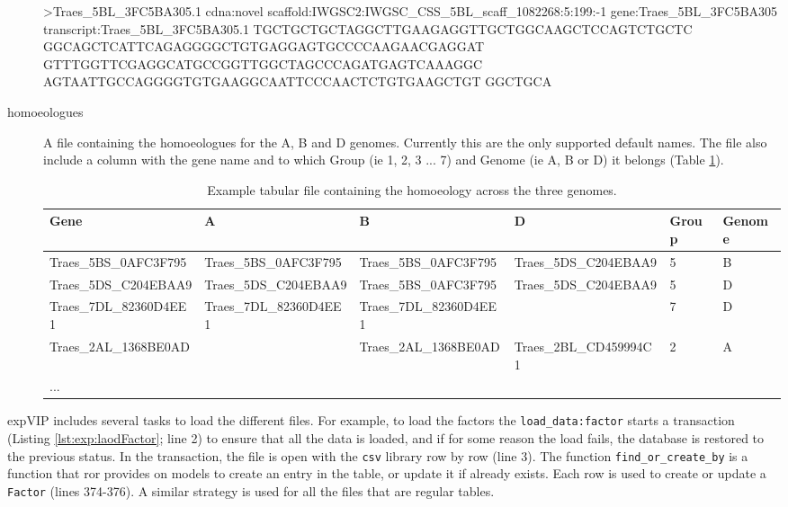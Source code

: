 \begin{description}
\begin{code}[label=lst:poly:geneFa, caption={[Gene set fasta file] A fasta entry on of the gene set.}]
>Traes_5BL_3FC5BA305.1 cdna:novel scaffold:IWGSC2:IWGSC_CSS_5BL_scaff_1082268:5:199:-1 gene:Traes_5BL_3FC5BA305 transcript:Traes_5BL_3FC5BA305.1
TGCTGCTGCTAGGCTTGAAGAGGTTGCTGGCAAGCTCCAGTCTGCTC
GGCAGCTCATTCAGAGGGGCTGTGAGGAGTGCCCCAAGAACGAGGAT
GTTTGGTTCGAGGCATGCCGGTTGGCTAGCCCAGATGAGTCAAAGGC
AGTAATTGCCAGGGGTGTGAAGGCAATTCCCAACTCTGTGAAGCTGT
GGCTGCA
\end{code}
\item[homoeologues] A file containing the homoeologues for the  A, B and D genomes. Currently this are the only supported default names. The file also include a column with the gene name and to which Group (ie 1, 2, 3 ... 7) and Genome (ie A, B or D) it belongs (Table \ref{tab:exp:hom}).  

\begin{table}
\centering
\caption[Homoeology file]{Example tabular file containing the homoeology across the three genomes. }
\label{tab:exp:hom}
\begin{tabular}{llllll}
\toprule
Gene & A & B & D & Group & Genome \\
\midrule
Traes\_5BS\_0AFC3F795 & Traes\_5BS\_0AFC3F795 & Traes\_5BS\_0AFC3F795 & Traes\_5DS\_C204EBAA9 & 5 & B \\
Traes\_5DS\_C204EBAA9 & Traes\_5DS\_C204EBAA9 & Traes\_5BS\_0AFC3F795 & Traes\_5DS\_C204EBAA9 & 5 & D \\
Traes\_7DL\_82360D4EE1 & Traes\_7DL\_82360D4EE1 & Traes\_7DL\_82360D4EE1 & & 7 & D \\
Traes\_2AL\_1368BE0AD & & Traes\_2AL\_1368BE0AD & Traes\_2BL\_CD459994C1 & 2 & A \\
... & & & & &  \\
\bottomrule 
\end{tabular}
\end{table}
\end{description} 

expVIP includes several tasks to load the different files. 
For example, to load the factors the \verb|load_data:factor| starts a transaction (Listing \ref{lst:exp:laodFactor}; line 2) to ensure that all the data is loaded, and if for some reason the load fails, the database is restored to the previous status.
In the transaction, the file is open with the \verb|csv| library row by row (line 3).
The function \verb|find_or_create_by| is a function that \acrshort{ror} provides on models to create an entry in the table, or update it if already exists.
Each row is used to create or update a \verb|Factor| (lines 374-376). 
A similar strategy is used for all the files that are regular tables. 

